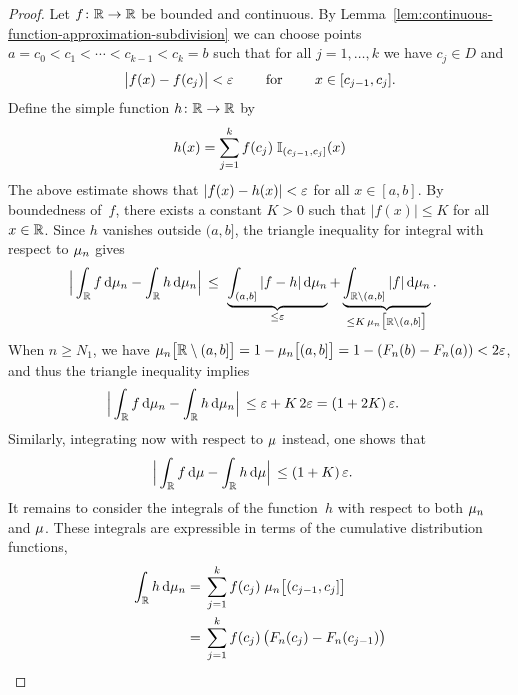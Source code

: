 \begin{proof}
  Let $f \colon \mathbb{R} \to \mathbb{R}$ be bounded and continuous.
  By Lemma~\ref{lem:continuous-function-approximation-subdivision}
  we can choose points
  $a=c_0 < c_1 < \cdots < c_{k-1} < c_k = b$ such that
  for all $j = 1 , \ldots , k$ we have $c_j \in D$ and
  \begin{align*}
  \big| f(x) - f(c_j) \big| < \varepsilon
  \qquad \text{ for } \qquad x \in [c_{j-1} , c_j] .
  \end{align*}
  Define the simple function $h \colon \mathbb{R} \to \mathbb{R}$ by
  \begin{align*}
  h(x) = \sum_{j=1}^k f(c_j) \; \mathbb{I}_{{(c_{j-1},c_j]}}(x)
  \end{align*}
  The above estimate shows that $|f(x) - h(x)| < \varepsilon$ for all $x \in [a,b]$.
  By boundedness of~$f$, there exists a constant $K>0$ such that $|f(x)| \leq K$
  for all $x \in \mathbb{R}$. Since $h$ vanishes outside $(a,b]$,
  the triangle inequality for integral with respect to $\mu_n$ gives
  \begin{align*}
  \Big| \int_{\bR} f \, \ud \PRmeas_n - \int_{\bR} h \, \ud \PRmeas_n \Big|
  \, \leq \; & \, \underbrace{\int_{(a,b]} |f-h| \, \ud \PRmeas_n}_{\leq \eps}
      + \underbrace{\int_{\bR \setminus (a,b]} |f| \, \ud \PRmeas_n}_{%
      \leq K \, \PRmeas_n\big[ \bR \setminus (a,b] \big]} .
  \end{align*}
  When $n \geq N_1$, we have
  $\mu_n\big[ \mathbb{R} \setminus (a,b] \big]
  = 1 - \mu_n\big[ (a,b] \big] = 1 - (F_n(b) - F_n(a)) < 2 \varepsilon$,
  and thus the triangle inequality implies
  \begin{align*}
  \Big| \int_{\mathbb{R}} f \, \mathrm{d} \mu_n - \int_{\mathbb{R}} h \, \mathrm{d} \mu_n \Big|
  \, \leq \; & \varepsilon + K \, 2 \varepsilon = (1 + 2K) \, \varepsilon .
  \end{align*}
  Similarly, integrating now with respect to $\mu$ instead, one shows that
  \begin{align*}
  \Big| \int_{\mathbb{R}} f \, \mathrm{d} \mu - \int_{\mathbb{R}} h \, \mathrm{d} \mu \Big|
  \, \leq \; & (1 + K) \, \varepsilon .
  \end{align*}
  It remains to consider the integrals of the function~$h$ with respect to both
  $\mu_n$ and $\mu$. These integrals are expressible in terms of the
  cumulative distribution functions,
  \begin{align*}
  \int_{\mathbb{R}} h \, \mathrm{d} \mu_n
  = \; & \sum_{j=1}^k f(c_j) \; \mu_n \big[ (c_{j-1},c_j] \big]
          \\
  = \; & \sum_{j=1}^k f(c_j) \, \big( F_n(c_j) - F_n(c_{j-1}) \big)
  \end{align*}

\end{proof}
